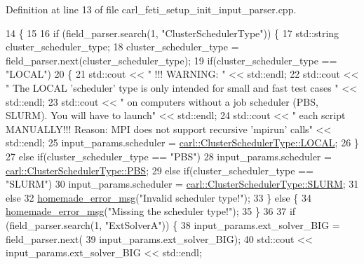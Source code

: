 Definition at line 13 of file carl\+\_\+feti\+\_\+setup\+\_\+init\+\_\+input\+\_\+parser.\+cpp.


\begin{DoxyCode}
14                                               \{
15 
16     \textcolor{keywordflow}{if} (field\_parser.search(1, \textcolor{stringliteral}{"ClusterSchedulerType"})) \{
17         std::string cluster\_scheduler\_type;
18         cluster\_scheduler\_type = field\_parser.next(cluster\_scheduler\_type);
19         \textcolor{keywordflow}{if}(cluster\_scheduler\_type == \textcolor{stringliteral}{"LOCAL"})
20         \{
21             std::cout << \textcolor{stringliteral}{" !!! WARNING: "} << std::endl;
22             std::cout << \textcolor{stringliteral}{"        The LOCAL 'scheduler' type is only intended for small and fast test cases
      "} << std::endl;
23             std::cout << \textcolor{stringliteral}{"     on computers without a job scheduler (PBS, SLURM). You will have to launch"} 
      << std::endl;
24             std::cout << \textcolor{stringliteral}{"     each script MANUALLY!!! Reason: MPI does not support recursive 'mpirun'
       calls"} << std::endl;
25             input\_params.scheduler = \hyperlink{namespacecarl_a67066fdf35a0c326f5147098c0cf45d1a2bec097bc495ac4aacc355d3283f4b93}{carl::ClusterSchedulerType::LOCAL};
26         \}
27         \textcolor{keywordflow}{else} \textcolor{keywordflow}{if}(cluster\_scheduler\_type == \textcolor{stringliteral}{"PBS"})
28             input\_params.scheduler = \hyperlink{namespacecarl_a67066fdf35a0c326f5147098c0cf45d1adc92b93f87f72ed91ac097d8c15da06e}{carl::ClusterSchedulerType::PBS};
29         \textcolor{keywordflow}{else} \textcolor{keywordflow}{if}(cluster\_scheduler\_type == \textcolor{stringliteral}{"SLURM"})
30             input\_params.scheduler = \hyperlink{namespacecarl_a67066fdf35a0c326f5147098c0cf45d1a07a7582870a2087891d8eeaddf964ba0}{carl::ClusterSchedulerType::SLURM};
31         \textcolor{keywordflow}{else}
32             \hyperlink{common__header_8h_a05d65d26b911668ac90085745dca71f6}{homemade\_error\_msg}(\textcolor{stringliteral}{"Invalid scheduler type!"});
33     \} \textcolor{keywordflow}{else} \{
34         \hyperlink{common__header_8h_a05d65d26b911668ac90085745dca71f6}{homemade\_error\_msg}(\textcolor{stringliteral}{"Missing the scheduler type!"});
35     \}
36 
37     \textcolor{keywordflow}{if} (field\_parser.search(1, \textcolor{stringliteral}{"ExtSolverA"})) \{
38         input\_params.ext\_solver\_BIG = field\_parser.next(
39                 input\_params.ext\_solver\_BIG);
40         std::cout << input\_params.ext\_solver\_BIG << std::endl;

\end{DoxyCode}
